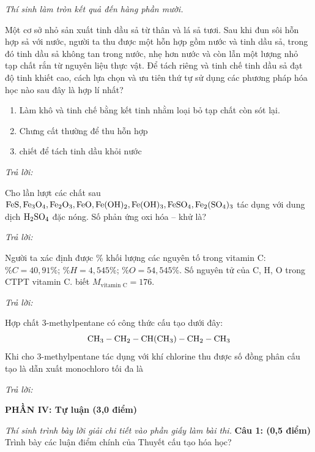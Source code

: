 \documentclass[11pt,a4paper]{article}
\begin{document}
\textit{Thí sinh làm tròn kết quả đến hàng phần mười.}
\vspace{4pt}
\begin{ex}
Một cơ sở nhỏ sản xuất tinh dầu sả từ thân và lá sả tươi. Sau khi đun sôi hỗn hợp sả với nước, người ta thu được một hỗn hợp gồm nước và tinh dầu sả, trong đó tinh dầu sả không tan trong nước, nhẹ hơn nước và còn lẫn một lượng nhỏ tạp chất rắn từ nguyên liệu thực vật. Để tách riêng và tinh chế tinh dầu sả đạt độ tinh khiết cao, cách lựa chọn và ưu tiên thứ tự sử dụng các phương pháp hóa học nào sau đây là hợp lí nhất?
\begin{enumerate}[label=\arabic*.,leftmargin=20pt,itemsep=0pt]
\item Làm khô và tinh chế bằng kết tinh nhằm loại bỏ tạp chất còn sót lại.
\item Chưng cất thường để thu hỗn hợp
\item chiết để tách tinh dầu khỏi nước
\end{enumerate}
\par\textit{Trả lời:} \dotfill
\loigiai{}
\end{ex}
\begin{ex}
Cho lần lượt các chất sau $\ce{FeS}, \ce{Fe3O4}, \ce{Fe2O3}, \ce{FeO}, \ce{Fe(OH)2}, \ce{Fe(OH)3}, \ce{FeSO4}, \ce{Fe2(SO4)3}$ tác dụng với dung dịch $\ce{H2SO4}$ đặc nóng. Số phản ứng oxi hóa -- khử là?
\par\textit{Trả lời:} \dotfill
\loigiai{}
\end{ex}
\begin{ex}
Người ta xác định được \% khối lượng các nguyên tố trong vitamin C: $\%C = 40{,}91\%$; $\%H = 4{,}545\%$; $\%O = 54{,}545\%$. Số nguyên tử của C, H, O trong CTPT vitamin C. biết $M_{\text{vitamin C}} = 176$.
\par\textit{Trả lời:} \dotfill
\loigiai{}
\end{ex}
\begin{ex}
Hợp chất 3-methylpentane có công thức cấu tạo dưới đây:
\[
\ce{CH3 - CH2 - CH(CH3) - CH2 - CH3}
\]
Khi cho 3-methylpentane tác dụng với khí chlorine thu được số đồng phân cấu tạo là dẫn xuất monochloro tối đa là
\par\textit{Trả lời:} \dotfill
\loigiai{}
\end{ex}

\vspace{6pt}
{\large\bfseries\color{mainGreen} PHẦN IV: Tự luận (3,0 điểm)}

\textit{Thí sinh trình bày lời giải chi tiết vào phần giấy làm bài thi.}
\vspace{4pt}
\textbf{Câu 1: (0,5 điểm)} Trình bày các luận điểm chính của Thuyết cấu tạo hóa học?
\end{document}
